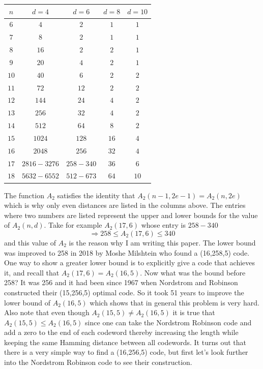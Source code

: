 \documentclass{article}
\theoremstyle{remark}
\begin{document}
	\begin{center}
		{\renewcommand{\arraystretch}{1.15}
		\begin{tabular}{|c|c|c|c|c|}
			\hline
			$n$ & $d=4$ & $d=6$ & $d=8$ & $d=10$ \\
			\hline
			$6$ & $4$ & $2$ & $1$ & $1$ \\
			\hline
			$7$ & $8$ & $2$ & $1$ & $1$ \\
			\hline
			$8$ & $16$ & $2$ & $2$ & $1$ \\
			\hline
			$9$ & $20$ & $4$ & $2$ & $1$ \\
			\hline
			$10$ & $40$ & $6$ & $2$ & $2$ \\
			\hline
			$11$ & $72$ & $12$ & $2$ & $2$ \\
			\hline
			$12$ & $144$ & $24$ & $4$ & $2$ \\
			\hline
			$13$ & $256$ & $32$ & $4$ & $2$ \\
			\hline
			$14$ & $512$ & $64$ & $8$ & $2$ \\
			\hline
			$15$ & $1024$ & $128$ & $16$ & $4$ \\
			\hline
			$16$ & $2048$ & $256$ & $32$ & $4$ \\
			\hline
			$17$ & $2816-3276$ & $258-340$ & $36$ & $6$ \\
			\hline
			$18$ & $5632-6552$ & $512-673$ & $64$ & $10$ \\
			\hline
		\end{tabular}
	}
	\end{center}
	The function $A_2$ satisfies the identity that $A_2(n-1,2e-1)=A_2(n,2e)$ which is why only even distances are listed in the columns above.  The entries where two numbers are listed represent the upper and lower bounds for the value of $A_2(n,d)$.  Take for example $A_2(17,6)$ whose entry is $258-340$
	\begin{equation*}
		\Rightarrow 258\leq A_2(17,6)\leq 340
	\end{equation*}
	and this value of $A_2$ is the reason why I am writing this paper.  The lower bound was improved to 258 in 2018 by Moshe Milshtein \cite{Milshtein} who found a (16,258,5) code.  One way to show a greater lower bound is to explicitly give a code that achieves it, and recall that $A_2(17,6)=A_2(16,5)$.  Now what was the bound before 258?  It was 256 and it had been  since 1967 when Nordstrom and Robinson \cite{NS} constructed their (15,256,5) optimal code.  So it took 51 years to improve the lower bound of $A_2(16,5)$ which shows that in general this problem is very hard.  Also note that even though $A_2(15,5)\neq A_2(16,5)$ it is true that $A_2(15,5)\leq A_2(16,5)$ since one can take the Nordstrom Robinson code and add a zero to the end of each codeword thereby increasing the length while keeping the same Hamming distance between all codewords.  It turns out that there is a very simple way to find a (16,256,5) code, but first let's look further into the Nordstrom Robinson code to see their construction.
	
\end{document}

